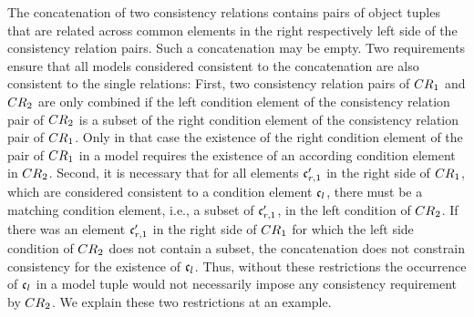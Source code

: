 The concatenation of two consistency relations contains pairs of object tuples that are related across common elements in the right respectively left side of the consistency relation pairs.
Such a concatenation may be empty.
Two requirements ensure that all models considered consistent to the concatenation are also consistent to the single relations:
First, two consistency relation pairs of $\consistencyrelation{CR}{1}$ and $\consistencyrelation{CR}{2}$ are only combined if the left condition element of the consistency relation pair of $\consistencyrelation{CR}{2}$ is a subset of the right condition element of the consistency relation pair of $\consistencyrelation{CR}{1}$.
Only in that case the existence of the right condition element of the pair of $\consistencyrelation{CR}{1}$ in a model requires the existence of an according condition element in $\consistencyrelation{CR}{2}$.
Second, it is necessary that for all elements $\conditionelement{c}{r,1}'$ in the right side of $\consistencyrelation{CR}{1}$, which are considered consistent to a condition element $\conditionelement{c}{l}$, there must be a matching condition element, i.e., a subset of $\conditionelement{c}{r,1}'$, in the left condition of $\consistencyrelation{CR}{2}$.
If there was an element $\conditionelement{c}{r,1}'$ in the right side of $\consistencyrelation{CR}{1}$ for which the left side condition of $\consistencyrelation{CR}{2}$ does not contain a subset, the concatenation does not constrain consistency for the existence of $\conditionelement{c}{l}$.
Thus, without these restrictions the occurrence of $\conditionelement{c}{l}$ in a model tuple would not necessarily impose any consistency requirement by $\consistencyrelation{CR}{2}$.
We explain these two restrictions at an example.


